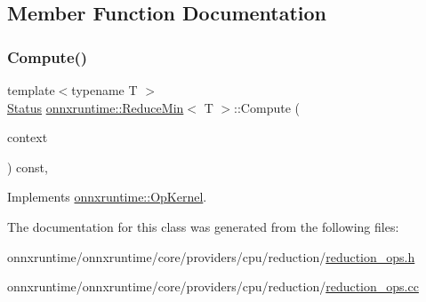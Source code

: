 \subsection{Member Function Documentation}
\mbox{\label{classonnxruntime_1_1ReduceMin_a938dcceb5bcd6f1783bd42dcdb33adab}} 
\subsubsection{\texorpdfstring{Compute()}{Compute()}}
{\footnotesize\ttfamily template$<$typename T $>$ \\
\mbox{\hyperlink{classonnxruntime_1_1common_1_1Status}{Status}} \mbox{\hyperlink{classonnxruntime_1_1ReduceMin}{onnxruntime\+::\+Reduce\+Min}}$<$ T $>$\+::Compute (\begin{DoxyParamCaption}\item[{\mbox{\hyperlink{classonnxruntime_1_1OpKernelContext}{Op\+Kernel\+Context}} $\ast$}]{context }\end{DoxyParamCaption}) const\hspace{0.3cm}{\ttfamily [override]}, {\ttfamily [virtual]}}



Implements \mbox{\hyperlink{classonnxruntime_1_1OpKernel_a9eca8656a78b1b3ab9d3351a12798650}{onnxruntime\+::\+Op\+Kernel}}.



The documentation for this class was generated from the following files\+:\begin{DoxyCompactItemize}
\item 
onnxruntime/onnxruntime/core/providers/cpu/reduction/\mbox{\hyperlink{cpu_2reduction_2reduction__ops_8h}{reduction\+\_\+ops.\+h}}\item 
onnxruntime/onnxruntime/core/providers/cpu/reduction/\mbox{\hyperlink{cpu_2reduction_2reduction__ops_8cc}{reduction\+\_\+ops.\+cc}}\end{DoxyCompactItemize}
